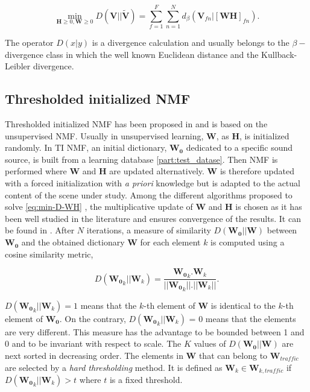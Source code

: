 \documentclass[12pt,english,twoside]{article}
\begin{document}
\begin{equation}\label{eq:min-D-WH}
\underset{\mathbf{H} \geq 0, \mathbf{W} \geq 0}{\min} D\left(\mathbf{V} \vert \vert \mathbf{\tilde{V}}\right) = \sum_{f = 1}^{F} \sum_{n = 1}^{N} d_{\beta}
\left(\textbf{V}_{fn} \vert \left[ \textbf{WH} \right]_{fn} \right).
\end{equation}

The operator $D(x\vert y)$ is a divergence calculation and usually belongs to the $\beta-$divergence class \cite{fevotte_nonnegative_2009} in which the well known Euclidean distance and the Kullback-Leibler divergence.

\subsection{Thresholded initialized NMF}
Thresholded initialized NMF has been proposed in \cite{gloaguen2019road} and is based on the unsupervised NMF. Usually in unsupervised learning, $\mathbf{W}$, as  $\mathbf{H}$, is initialized randomly. In TI NMF, an initial dictionary, $\mathbf{W_0}$ dedicated to a specific sound source, is built from a learning database \ref{part:test_datase}.
Then NMF is performed where $\mathbf{W}$ and $\mathbf{H}$ are updated alternatively. $\mathbf{W}$ is therefore updated with a forced initialization with \textit{a priori} knowledge but is adapted to the actual content of the scene under study. Among the different algorithms proposed to solve \ref{eq:min-D-WH} \cite{lee_algorithms_2000}, the multiplicative update of $\mathbf{W}$ and $\mathbf{H}$ is chosen as it has been well studied in the literature and ensures convergence of the results. It can be found in \cite{fevotte_algorithms_2011}.
After $N$ iterations, a measure of similarity $D\left(\mathbf{W_0} \vert \vert \mathbf{W} \right)$ between $\mathbf{W_0}$ and the obtained dictionary $\mathbf{W}$ for each element $k$ is computed using a cosine similarity metric,

\begin{equation}
D\left(\mathbf{W_0}_k \vert \vert \mathbf{W}_k \right) = \frac{\mathbf{W_0}_k.\mathbf{W}_k}{\vert \vert \mathbf{W_0}_k  \vert \vert . \vert \vert \mathbf{W}_k \vert \vert}.
\end{equation}

$D\left(\mathbf{W_0}_k \vert \vert \mathbf{W}_k \right) = 1$ means that the $k$-th element of $\mathbf{W}$ is identical to the $k$-th element of $\mathbf{W_0}$. On the contrary, $D\left(\mathbf{W_0}_k \vert \vert \mathbf{W}_k \right)$ = 0 means that the elements are very different. This measure has the advantage to be bounded between 1 and 0 and to be invariant with respect to scale. The $K$ values of $D\left(\mathbf{W_0} \vert \vert \mathbf{W} \right)$ are next sorted in decreasing order. The elements in $\mathbf{W}$ that can belong to $\mathbf{W}_{traffic}$ are selected by a \textit{hard thresholding} method. It is defined as $\mathbf{W}_k \in \mathbf{W}_{k,traffic}$ if $D\left(\mathbf{W_0}_k \vert \vert \mathbf{W}_{k} \right) > t$ where $t$ is a fixed threshold.
\end{document}
